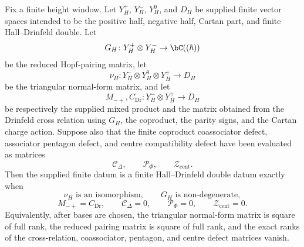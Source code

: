 \begin{proposition}
\label{prop:finite-drinfeld-double-datum-gate}
Fix a finite height window. Let \(Y_H^+\), \(Y_H^-\), \(Y_H^0\), and
\(D_H\) be supplied finite vector spaces intended to be the positive
half, negative half, Cartan part, and finite Hall--Drinfeld double. Let
\[
 G_H\colon Y_H^+\otimes Y_H^-\to \bC((\hbar))
\]
be the reduced Hopf-pairing matrix, let
\[
 \nu_H\colon Y_H^-\otimes Y_H^0\otimes Y_H^+\longrightarrow D_H
\]
be the triangular normal-form matrix, and let
\[
 M_{-+},C_{\mathrm{Dr}}\colon Y_H^-\otimes Y_H^+\longrightarrow D_H
\]
be respectively the supplied mixed product and the matrix obtained from
the Drinfeld cross relation using \(G_H\), the coproduct, the parity
signs, and the Cartan charge action. Suppose also that the finite
coproduct coassociator defect, associator pentagon defect, and centre
compatibility defect have been evaluated as matrices
\[
 \mathcal C_\Delta,\qquad \mathcal P_\Phi,\qquad \mathcal Z_{\mathrm{cent}}.
\]
Then the supplied finite datum is a finite Hall--Drinfeld double datum
exactly when
\[
 \nu_H \text{ is an isomorphism},\qquad
 G_H \text{ is non-degenerate},
\]
\[
 M_{-+}=C_{\mathrm{Dr}},\qquad
 \mathcal C_\Delta=0,\qquad
 \mathcal P_\Phi=0,\qquad
 \mathcal Z_{\mathrm{cent}}=0.
\]
Equivalently, after bases are chosen, the triangular normal-form matrix
is square of full rank, the reduced pairing matrix is square of full
rank, and the exact ranks of the cross-relation, coassociator,
pentagon, and centre defect matrices vanish.
\end{proposition}


